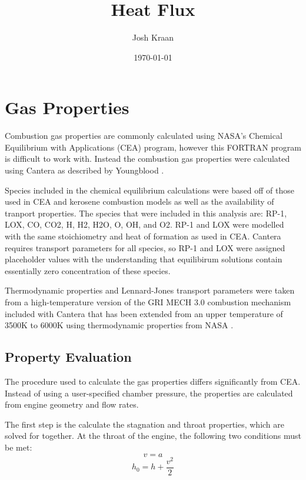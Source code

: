 \documentclass[11pt]{article}
\title{Heat Flux}
\author{Josh Kraan}
\date{\today}
\begin{document}
\maketitle

\section{Gas Properties}


Combustion gas properties are commonly calculated using NASA's Chemical Equilibrium with Applications (CEA) \cite{} program, however this FORTRAN program is difficult to work with. Instead the combustion gas properties were calculated using Cantera as described by Youngblood \cite{}.

Species included in the chemical equilibrium calculations were based off of those used in CEA and kerosene combustion models \cite{} as well as the availability of tranport properties. The species that were included in this analysis are: RP-1, LOX, CO, CO2, H, H2, H2O, O, OH, and O2. RP-1 and LOX were modelled with the same stoichiometry and heat of formation as used in CEA. Cantera requires transport parameters for all species, so RP-1 and LOX were assigned placeholder values with the understanding that equilibirum solutions contain essentially zero concentration of these species.

Thermodynamic properties and Lennard-Jones transport parameters were taken from a high-temperature version of the GRI MECH 3.0 combustion mechanism \cite{} included with Cantera that has been extended from an upper temperature of 3500K to 6000K using thermodynamic properties from NASA \cite{}.

\subsection{Property Evaluation}


The procedure used to calculate the gas properties differs significantly from CEA. Instead of using a user-specified chamber pressure, the properties are calculated from engine geometry and flow rates.

The first step is the calculate the stagnation and throat properties, which are solved for together. At the throat of the engine, the following two conditions must be met:
\begin{equation}\label{cond:mach}
  v = a
\end{equation}%
\begin{equation}\label{cond:enthalpy}
  h_0 = h + \frac{v^2}{2}
\end{equation}
\end{document}
